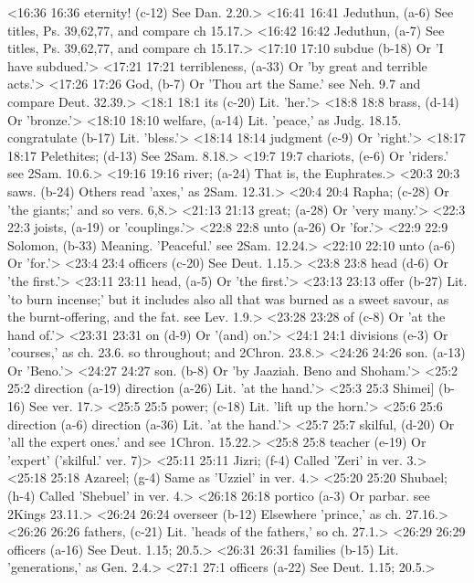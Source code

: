 <16:36 16:36  eternity! (c-12)  See Dan. 2.20.>
<16:41 16:41  Jeduthun, (a-6) See titles, Ps. 39,62,77, and compare ch 15.17.>
<16:42 16:42  Jeduthun, (a-7)  See titles, Ps. 39,62,77, and compare ch 15.17.>
<17:10 17:10  subdue (b-18)  Or 'I have subdued.'>
<17:21 17:21  terribleness, (a-33)  Or 'by great and terrible acts.'>
<17:26 17:26  God, (b-7)  Or 'Thou art the Same.' see Neh. 9.7 and compare Deut. 32.39.>
<18:1 18:1  its (c-20)  Lit. 'her.'>
<18:8 18:8  brass, (d-14)  Or 'bronze.'>
<18:10 18:10  welfare, (a-14)  Lit. 'peace,' as Judg. 18.15.
  congratulate (b-17)  Lit. 'bless.'>
<18:14 18:14  judgment (c-9)  Or 'right.'>
<18:17 18:17  Pelethites; (d-13)  See 2Sam. 8.18.>
<19:7 19:7  chariots, (e-6)  Or 'riders.' see 2Sam. 10.6.>
<19:16 19:16  river; (a-24)  That is, the Euphrates.>
<20:3 20:3  saws. (b-24)  Others read 'axes,' as 2Sam. 12.31.>
<20:4 20:4  Rapha; (c-28)  Or 'the giants;' and so vers. 6,8.>
<21:13 21:13  great; (a-28)  Or 'very many.'>
<22:3 22:3  joists, (a-19)  or 'couplings.'>
<22:8 22:8  unto (a-26) Or 'for.'>
<22:9 22:9  Solomon, (b-33)  Meaning. 'Peaceful.' see 2Sam. 12.24.>
<22:10 22:10  unto (a-6)  Or 'for.'>
<23:4 23:4  officers (c-20)  See Deut. 1.15.>
<23:8 23:8  head (d-6)  Or 'the first.'>
<23:11 23:11  head, (a-5)  Or 'the first.'>
<23:13 23:13  offer (b-27)  Lit. 'to burn incense;' but it includes also all that was  burned as a sweet savour, as the burnt-offering, and the fat.  see Lev. 1.9.>
<23:28 23:28  of (c-8)  Or 'at the hand of.'>
<23:31 23:31  on (d-9)  Or '(and) on.'>
<24:1 24:1  divisions (e-3)  Or 'courses,' as ch. 23.6. so throughout; and 2Chron. 23.8.>
<24:26 24:26  son. (a-13)  Or 'Beno.'>
<24:27 24:27  son. (b-8)  Or 'by Jaaziah. Beno and Shoham.'>
<25:2 25:2  direction (a-19)  direction (a-26)
  Lit. 'at the hand.'>
<25:3 25:3  Shimei] (b-16)  See ver. 17.>
<25:5 25:5  power; (c-18)  Lit. 'lift up the horn.'>
<25:6 25:6  direction (a-6)  direction (a-36)
  Lit. 'at the hand.'>
<25:7 25:7  skilful, (d-20)  Or 'all the expert ones.' and see 1Chron. 15.22.>
<25:8 25:8  teacher (e-19)  Or 'expert' ('skilful.' ver. 7)>
<25:11 25:11  Jizri; (f-4)  Called 'Zeri' in ver. 3.>
<25:18 25:18  Azareel; (g-4)  Same as 'Uzziel' in ver. 4.>
<25:20 25:20  Shubael; (h-4)  Called 'Shebuel' in ver. 4.>
<26:18 26:18  portico (a-3)  Or parbar. see 2Kings 23.11.>
<26:24 26:24  overseer (b-12)  Elsewhere 'prince,' as ch. 27.16.>
<26:26 26:26  fathers, (c-21)  Lit. 'heads of the fathers,' so ch. 27.1.>
<26:29 26:29  officers (a-16) See Deut. 1.15; 20.5.>
<26:31 26:31  families (b-15)  Lit. 'generations,' as Gen. 2.4.>
<27:1 27:1  officers (a-22)  See Deut. 1.15; 20.5.>

